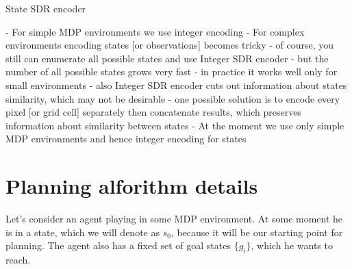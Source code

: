 \documentclass[a4paper]{article}
\begin{document}

State SDR encoder

- For simple MDP environments we use integer encoding
- For complex environments encoding states [or observations] becomes tricky
  - of course, you still can enumerate all possible states and use Integer SDR encoder
  - but the number of all possible states grows very fast
    - in practice it works well only for small environments
  - also Integer SDR encoder cuts out information about states similarity, which may not be desirable
  - one possible solution is to encode every pixel [or grid cell] separately then concatenate results, which preserves information about similarity between states
- At the moment we use only simple MDP environments and hence integer encoding for states

\section{Planning alforithm details}

Let's consider an agent playing in some MDP environment. At some moment he is in a state, which we will denote as $s_0$, because it will be our starting point for planning.  
The agent also has a fixed set of goal states $\{g_i\}$, which he wants to reach.
\end{document}
